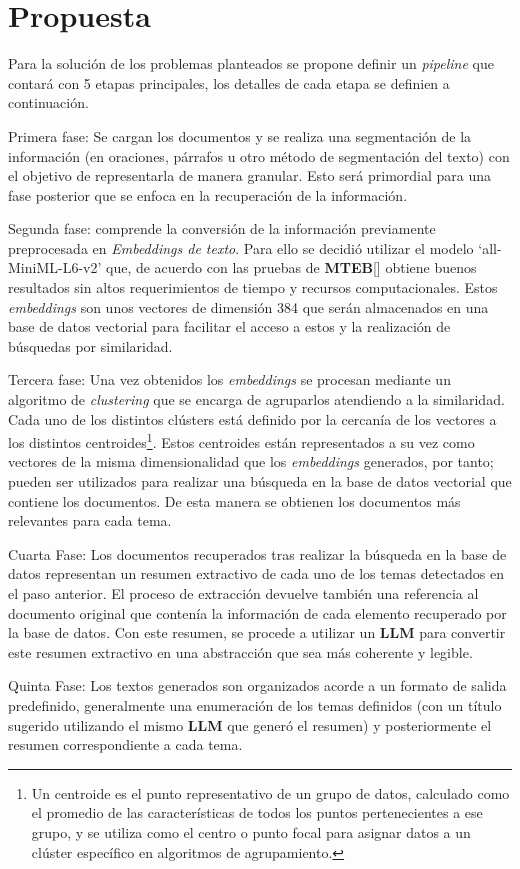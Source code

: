 \chapter{Propuesta}\label{chapter:proposal}
    Para la solución de los problemas planteados se propone definir un \emph{pipeline} que contará con 5 etapas principales, los detalles de cada etapa se definien a continuación.

    Primera fase: Se cargan los documentos y se realiza una segmentación de la información (en oraciones, párrafos u otro método de segmentación del texto) con el objetivo de representarla de manera granular. Esto será primordial para una fase posterior que se enfoca en la recuperación de la información.
    
    Segunda fase: comprende la conversión de la información previamente preprocesada en \emph{Embeddings de texto}. Para ello se decidió utilizar el modelo `all-MiniML-L6-v2' que, de acuerdo con las pruebas de \textbf{MTEB}[\cite{leaderboard}] obtiene buenos resultados sin altos requerimientos de tiempo y recursos computacionales. Estos \emph{embeddings} son unos vectores de dimensión 384 que serán almacenados en una base de datos vectorial para facilitar el acceso a estos y la realización de búsquedas por similaridad.

    Tercera fase: Una vez obtenidos los \emph{embeddings} se procesan  mediante un algoritmo de \emph{clustering} que se encarga de agruparlos atendiendo a la similaridad. Cada uno de los distintos clústers está definido por la cercanía de los vectores a los distintos centroides\footnote{Un centroide es el punto representativo de un grupo de datos, calculado como el promedio de las características de todos los puntos pertenecientes a ese grupo, y se utiliza como el centro o punto focal para asignar datos a un clúster específico en algoritmos de agrupamiento.}. Estos centroides están representados a su vez como vectores de la misma dimensionalidad que los \emph{embeddings} generados, por tanto; pueden ser utilizados para realizar una búsqueda en la base de datos vectorial que contiene los documentos. De esta manera se obtienen los documentos más relevantes para cada tema.

    Cuarta Fase: Los documentos recuperados tras realizar la búsqueda en la base de datos representan un resumen extractivo de cada uno de los temas detectados en el paso anterior. El proceso de extracción devuelve también una referencia al documento original que contenía la información de cada elemento recuperado por la base de datos. Con este resumen, se procede a utilizar un \textbf{LLM} para convertir este resumen extractivo en una abstracción que sea más coherente y legible.

    Quinta Fase: Los textos generados son organizados acorde a un formato de salida predefinido, generalmente una enumeración de los temas definidos (con un título sugerido utilizando el mismo \textbf{LLM} que generó el resumen) y posteriormente el resumen correspondiente a cada tema.
